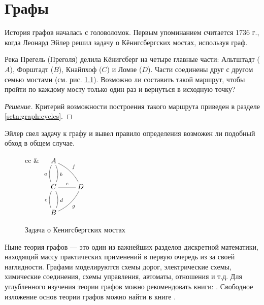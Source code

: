 \chapter{Графы}

История графов началась с головоломок. Первым упоминанием считается 1736 г., когда Леонард Эйлер решил задачу о Кёнигсбергских мостах, используя граф.
\begin{exampl}
    Река Прегель (Преголя) делила Кёнигсберг на четыре главные части: Альтштадт ($A$), Форштадт ($B$), Кнайпхоф ($C$) и Ломзе ($D$). Части соединены друг с другом семью мостами (см. рис. \ref{fig:graph:kenigsberg}). Возможно ли составить такой маршрут, чтобы пройти по каждому мосту только один раз и вернуться в исходную точку?    
\end{exampl}
\begin{proof}[Решение]
    Критерий возможности построения такого маршрута приведен в разделе \ref{sctn:graph:cycles}.
\end{proof}

Эйлер свел задачу к графу и вывел правило определения возможен ли подобный обход в общем случае.
\begin{figure}
    \centering
    \begin{tabular}{cc}
        &
        \(
            {\xymatrix{
                A \ar@{-}@/^/[d]^b \ar@{-}@/_/[d]_a \ar@{-}@/^/[dr]^f
                    &*{}
                        \\
                C \ar@{-}[r]^e
                    &D
                        \\
                B \ar@{-}@/^/[u]^c \ar@{-}@/_/[u]_d \ar@{-}@/_/[ur]_g
                    &*{}
            }}
        \)        
    \end{tabular}
    \caption{Задача о Кенигсбергских мостах}
    \label{fig:graph:kenigsberg}
\end{figure}


Ныне теория графов --- это один из важнейших разделов дискретной математики, находящий массу практических применений в первую очередь из за своей наглядности. Графами моделируются схемы дорог, электрические схемы, химические соединения, схемы управления, автоматы, отношения и т.д. Для углубленного изучения теории графов можно рекомендовать книги: \cite{bib:shaporev:discretemath, bib:gorbatovs:discrmath, bib:novic:discrmathprogrammer}. Свободное изложение основ теории графов можно найти в книге \cite{bib:ore:graphs}.


